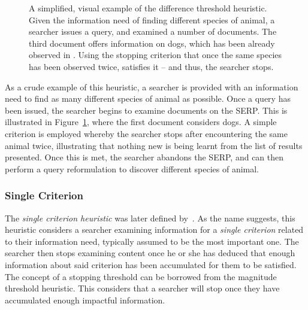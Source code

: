 \begin{figure}[t!]
    \centering
    \caption[Difference threshold heuristic]{A simplified, visual example of the difference threshold heuristic. Given the information need of finding different species of animal, a searcher issues a query, and examined a number of documents. The third document offers information on dogs, which has been already observed in . Using the stopping criterion that once the same species has been observed twice,  satisfies it – and thus, the searcher stops.}
    \label{fig:difference_heuristic}
\end{figure}

As a crude example of this heuristic, a searcher is provided with an information need to find as many different species of animal as possible. Once a query has been issued, the searcher begins to examine documents on the SERP. This is illustrated in Figure~\ref{fig:difference_heuristic}, where the first document considers dogs. A simple criterion is employed whereby the searcher stops after encountering the same animal twice, illustrating that nothing new is being learnt from the list of results presented. Once this is met, the searcher abandons the SERP, and can then perform a query reformulation to discover different species of animal.

\subsubsection{Single Criterion}
The \emph{single criterion heuristic} was later defined by~\cite{browne2005stopping_rules}. As the name suggests, this heuristic considers a searcher examining information for a \emph{single criterion} related to their information need, typically assumed to be the most important one. The searcher then stops examining content once he or she has deduced that enough information about said criterion has been accumulated for them to be satisfied. The concept of a stopping threshold can be borrowed from the magnitude threshold heuristic. This considers that a searcher will stop once they have accumulated enough impactful information.

